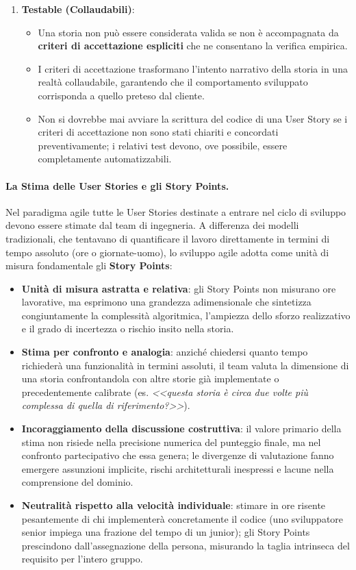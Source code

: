 \documentclass[12pt]{extarticle}
\begin{document}
\begin{enumerate}
    \item \textbf{Testable (Collaudabili)}:
    \begin{itemize}
        \item Una storia non può essere considerata valida se non è accompagnata da \textbf{criteri di accettazione espliciti} che ne consentano la verifica empirica.
        \item I criteri di accettazione trasformano l'intento narrativo della storia in una realtà collaudabile, garantendo che il comportamento sviluppato corrisponda a quello preteso dal cliente.
        \item Non si dovrebbe mai avviare la scrittura del codice di una User Story se i criteri di accettazione non sono stati chiariti e concordati preventivamente; i relativi test devono, ove possibile, essere completamente automatizzabili.
    \end{itemize}
\end{enumerate}

\paragraph{La Stima delle User Stories e gli Story Points.}
Nel paradigma agile tutte le User Stories destinate a entrare nel ciclo di sviluppo devono essere stimate dal team di ingegneria. A differenza dei modelli tradizionali, che tentavano di quantificare il lavoro direttamente in termini di tempo assoluto (ore o giornate-uomo), lo sviluppo agile adotta come unità di misura fondamentale gli \textbf{Story Points}:
\begin{itemize}
    \item \textbf{Unità di misura astratta e relativa}: gli Story Points non misurano ore lavorative, ma esprimono una grandezza adimensionale che sintetizza congiuntamente la complessità algoritmica, l'ampiezza dello sforzo realizzativo e il grado di incertezza o rischio insito nella storia.
    \item \textbf{Stima per confronto e analogia}: anziché chiedersi quanto tempo richiederà una funzionalità in termini assoluti, il team valuta la dimensione di una storia confrontandola con altre storie già implementate o precedentemente calibrate (es. \textit{<<questa storia è circa due volte più complessa di quella di riferimento?>>}).
    \item \textbf{Incoraggiamento della discussione costruttiva}: il valore primario della stima non risiede nella precisione numerica del punteggio finale, ma nel confronto partecipativo che essa genera; le divergenze di valutazione fanno emergere assunzioni implicite, rischi architetturali inespressi e lacune nella comprensione del dominio.
    \item \textbf{Neutralità rispetto alla velocità individuale}: stimare in ore risente pesantemente di chi implementerà concretamente il codice (uno sviluppatore senior impiega una frazione del tempo di un junior); gli Story Points prescindono dall'assegnazione della persona, misurando la taglia intrinseca del requisito per l'intero gruppo.
\end{itemize}
\end{document}
